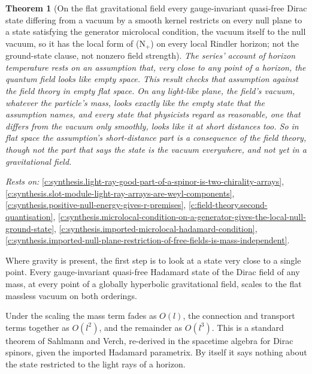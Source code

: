 \documentclass[11pt]{article}
\newtheorem{theorem}{Theorem}[section]
\theoremstyle{definition}
\theoremstyle{plain}
\begin{document}
\begin{theorem}[On the flat gravitational field every gauge-invariant quasi-free Dirac state differing from a vacuum by a smooth kernel restricts on every null plane to a state satisfying the generator microlocal condition, the vacuum itself to the null vacuum, so it has the local form of (N$_{+}$) on every local Rindler horizon; not the ground-state clause, not nonzero field strength]\label{c:synthesis.bulk-hadamard-states-restrict-to-the-generator-condition-on-flat-null-planes}
The series' account of horizon temperature rests on an assumption that, very close to any point of a horizon, the quantum field looks like empty space. This result checks that assumption against the field theory in empty flat space. On any light-like plane, the field's vacuum, whatever the particle's mass, looks exactly like the empty state that the assumption names, and every state that physicists regard as reasonable, one that differs from the vacuum only smoothly, looks like it at short distances too. So in flat space the assumption's short-distance part is a consequence of the field theory, though not the part that says the state is the vacuum everywhere, and not yet in a gravitational field.
\end{theorem}
\noindent\emph{Rests on:} \ref{c:synthesis.light-ray-good-part-of-a-spinor-is-two-chirality-arrays}, \ref{c:synthesis.slot-module-light-ray-arrays-are-weyl-components}, \ref{c:synthesis.positive-null-energy-gives-r-premises}, \ref{c:field-theory.second-quantisation}, \ref{c:synthesis.microlocal-condition-on-a-generator-gives-the-local-null-ground-state}, \ref{c:synthesis.imported-microlocal-hadamard-condition}, \ref{c:synthesis.imported-null-plane-restriction-of-free-fields-is-mass-independent}.

Where gravity is present, the first step is to look at a state very close to a single point. Every gauge-invariant quasi-free Hadamard state of the Dirac field of any mass, at every point of a globally hyperbolic gravitational field, scales to the flat massless vacuum on both orderings.

Under the scaling the mass term fades as $O(l)$, the connection and transport terms together as $O(l^{2})$, and the remainder as $O(l^{3})$. This is a standard theorem of Sahlmann and Verch, re-derived in the spacetime algebra for Dirac spinors, given the imported Hadamard parametrix. By itself it says nothing about the state restricted to the light rays of a horizon.
\end{document}
